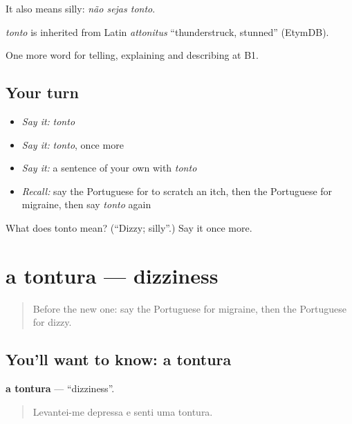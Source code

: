 It also means silly: \emph{não sejas tonto}.

\begin{cousinweb}
\emph{tonto} is inherited from Latin \emph{attonitus} \textquotedblleft{}thunderstruck, stunned\textquotedblright{} (EtymDB).
\end{cousinweb}

\begin{grammarlens}[title={What you've built}]
One more word for telling, explaining and describing at B1.
\end{grammarlens}

\subsection*{Your turn}
\begin{itemize}
\raggedright
  \item \emph{Say it:} \emph{tonto}
  \item \emph{Say it:} \emph{tonto}, once more
  \item \emph{Say it:} a sentence of your own with \emph{tonto}
  \item \emph{Recall:} say the Portuguese for to scratch an itch, then the Portuguese for migraine, then say \emph{tonto} again
\end{itemize}

\begin{tcolorbox}[breakable,colback=teal!4,colframe=teal!35!black,title={Before you move on}]
What does tonto mean? (\textquotedblleft{}Dizzy; silly\textquotedblright{}.) Say it once more.
\end{tcolorbox}
\section[a tontura]{a tontura — dizziness}

\label{lesson:PT-C484-tontura}



\begin{quote}
Before the new one: say the Portuguese for migraine, then the Portuguese for dizzy.
\end{quote}

\subsection*{You'll want to know: a tontura}
\textbf{a tontura} — \textquotedblleft{}dizziness\textquotedblright{}.

\begin{quote}
Levantei-me depressa e senti uma tontura.
\end{quote}

